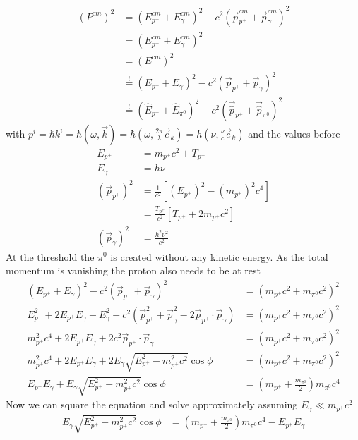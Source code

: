 \documentclass[10pt,a4paper]{book}
\theoremstyle{definition}
\begin{document}
\begin{enumerate}
    \begin{align}
        \left(P^{cm}\right)^2&=(E_{p^+}^{cm}+E_\gamma^{cm})^2-c^2(\vec{p}_{p^+}^{cm}+\vec{p}_\gamma^{cm})^2\\
        &=(E_{p^+}^{cm}+E_\gamma^{cm})^2\\
        &=(E^{cm})^2\\
        &\overset{!}{=}(E_{p^+}+E_\gamma)^2-c^2(\vec{p}_{p^+}+\vec{p}_\gamma)^2\\
        &\overset{!}{=}(\hat{E}_{p^+}+\hat{E}_{\pi^0})^2-c^2(\vec{\hat{p}}_{p^+}+\vec{\hat{p}}_{\pi^0})^2
    \end{align}
    with $p^i=\hbar k^i=\hbar(\omega,\vec{k})=\hbar(\omega,\frac{2\pi}{\lambda}\vec{e}_k)=h(\nu,\frac{\nu}{c}\vec{e}_k)$ and the values before
    \begin{align}
        E_{p^+}&=m_{p^+}c^2+T_{p^+}\\
        E_\gamma&=h\nu\\  
        (\vec{p}_{p^+})^2
        &=\frac{1}{c^2}\left[(E_{p^+})^2-(m_{p^+})^2c^4\right]\\
        &=\frac{T_{p^+}}{c^2}\left[T_{p^+}+2m_{p^+}c^2\right]\\
        (\vec{p}_\gamma)^2&=\frac{h^2\nu^2}{c^2}
    \end{align}
    At the threshold the $\pi^0$ is created without any kinetic energy. As the total momentum is vanishing the proton
    also needs to be at rest
    \begin{align}
        (E_{p^+}+E_\gamma)^2-c^2(\vec{p}_{p^+}+\vec{p}_\gamma)^2&=\left(m_{p^+}c^2+m_{\pi^0}c^2\right)^2\\
        E_{p^+}^2+2E_{p^+}E_\gamma+E_\gamma^2-c^2\left(\vec{p}_{p^+}^2+\vec{p}_\gamma^2-2\vec{p}_{p^+}\cdot\vec{p}_\gamma\right)&=\left(m_{p^+}c^2+m_{\pi^0}c^2\right)^2\\
        m_{p^+}^2c^4+2E_{p^+}E_\gamma+2c^2\vec{p}_{p^+}\cdot\vec{p}_\gamma&=\left(m_{p^+}c^2+m_{\pi^0}c^2\right)^2\\
        m_{p^+}^2c^4+2E_{p^+}E_\gamma+2E_\gamma\sqrt{E_{p^+}^2-m_{p^+}^2c^2}\cos{\phi}&=\left(m_{p^+}c^2+m_{\pi^0}c^2\right)^2\\
        E_{p^+}E_\gamma+E_\gamma\sqrt{E_{p^+}^2-m_{p^+}^2c^2}\cos{\phi}&=\left(m_{p^+}+\frac{m_{\pi^0}}{2}\right)m_{\pi^0}c^4
    \end{align}
    Now we can square the equation and solve approximately assuming $E_\gamma\ll m_{p^+}c^2$
    \begin{align}
        E_\gamma\sqrt{E_{p^+}^2-m_{p^+}^2c^2}\cos{\phi}&=\left(m_{p^+}+\frac{m_{\pi^0}}{2}\right)m_{\pi^0}c^4-E_{p^+}E_\gamma\\

\end{align}
\end{enumerate}
\end{document}
